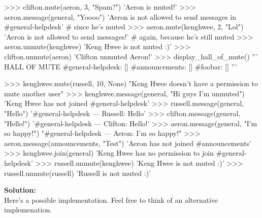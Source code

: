 \begin{python}
>>> clifton.mute(aeron, 3, "Spam?")
'Aeron is muted!'
>>> aeron.message(general, "Yoooo")
'Aeron is not allowed to send messages in #general-helpdesk'
# since he's muted
>>> aeron.mute(kenghwee, 2, "Lol")
'Aeron is not allowed to send messages!'
# again, because he's still muted
>>> aeron.unmute(kenghwee)
'Keng Hwee is not muted :)'
>>> clifton.unmute(aeron)
'Clifton unmuted Aeron!'
>>> display_hall_of_mute()
'''
HALL OF MUTE
#general-helpdesk: []
#announcements: []
#foobar: []
'''

>>> kenghwee.mute(russell, 10, None)
"Keng Hwee doesn't have a permission to mute another user"
>>> kenghwee.message(general, "Hi guys I'm unmuted")
'Keng Hwee has not joined #general-helpdesk'
>>> russell.message(general, "Hello")
'#general-helpdesk --- Russell: Hello'
>>> clifton.message(general, "Hello!")
'#general-helpdesk --- Clifton: Hello!'
>>> aeron.message(general, "I'm so happy!")
"#general-helpdesk --- Aeron: I'm so happy!"
>>> aeron.message(announcements, "Test")
'Aeron has not joined #announcements'
>>> kenghwee.join(general)
'Keng Hwee has no permission to join #general-helpdesk'
>>> russell.unmute(kenghwee)
'Keng Hwee is not muted :)'
>>> russell.unmute(russell)
'Russell is not muted :)'
\end{python}
\textbf{Solution:} \\
Here's a possible implementation. Feel free to think of an alternative implemenation.
